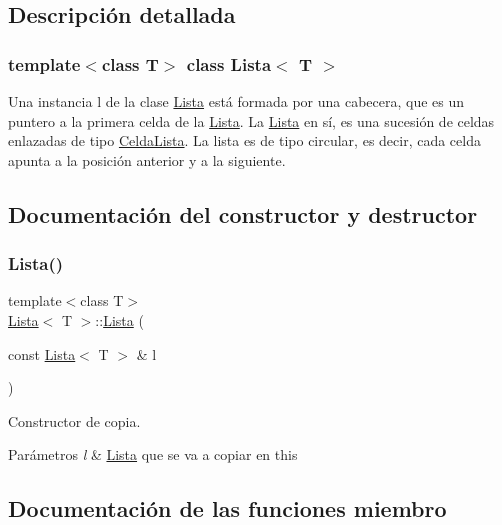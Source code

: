 \subsection{Descripción detallada}
\subsubsection*{template$<$class T$>$\newline
class Lista$<$ T $>$}

Una instancia l de la clase \mbox{\hyperlink{classLista}{Lista}} está formada por una cabecera, que es un puntero a la primera celda de la \mbox{\hyperlink{classLista}{Lista}}. La \mbox{\hyperlink{classLista}{Lista}} en sí, es una sucesión de celdas enlazadas de tipo \mbox{\hyperlink{structCeldaLista}{Celda\+Lista}}. La lista es de tipo circular, es decir, cada celda apunta a la posición anterior y a la siguiente. 

\subsection{Documentación del constructor y destructor}
\mbox{\label{classLista_ac9895a302242ab2d624e054357aeb13c}} 
\subsubsection{\texorpdfstring{Lista()}{Lista()}}
{\footnotesize\ttfamily template$<$class T$>$ \\
\mbox{\hyperlink{classLista}{Lista}}$<$ T $>$\+::\mbox{\hyperlink{classLista}{Lista}} (\begin{DoxyParamCaption}\item[{const \mbox{\hyperlink{classLista}{Lista}}$<$ T $>$ \&}]{l }\end{DoxyParamCaption})}



Constructor de copia. 


\begin{DoxyParams}{Parámetros}
{\em l} & \mbox{\hyperlink{classLista}{Lista}} que se va a copiar en this \\
\hline
\end{DoxyParams}


\subsection{Documentación de las funciones miembro}
\mbox{\label{classLista_af73b5f5eb9e67ae9d1346f045d648d0c}} 
